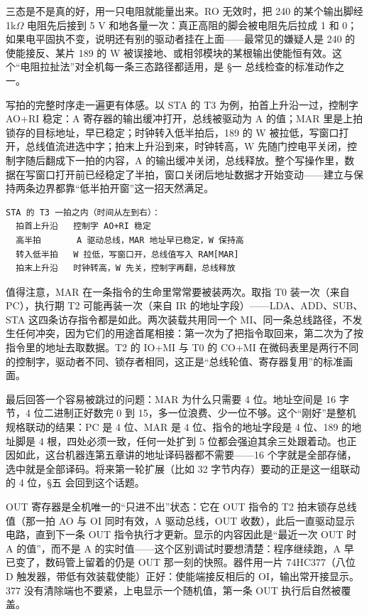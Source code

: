 三态是不是真的好，用一只电阻就能量出来。RO 无效时，把 240 的某个输出脚经 1k$\Omega$ 电阻先后接到 5 V 和地各量一次：真正高阻的脚会被电阻先后拉成 1 和 0；如果电平固执不变，说明还有别的驱动者挂在上面——最常见的嫌疑人是 240 的使能接反、某片 189 的 W 被误接地、或相邻模块的某根输出使能恒有效。这个“电阻拉扯法”对全机每一条三态路径都适用，是 §一 总线检查的标准动作之一。

写拍的完整时序走一遍更有体感。以 STA 的 T3 为例，拍首上升沿一过，控制字 AO+RI 稳定：A 寄存器的输出缓冲打开，总线被驱动为 A 的值；MAR 里是上拍锁存的目标地址，早已稳定；时钟转入低半拍后，189 的 W 被拉低，写窗口打开，总线值流进选中字；拍末上升沿到来，时钟转高，W 先随门控电平关闭，控制字随后翻成下一拍的内容，A 的输出缓冲关闭，总线释放。整个写操作里，数据在写窗口打开前已经稳定了半拍，窗口关闭后地址数据才开始变动——建立与保持两条边界都靠“低半拍开窗”这一招天然满足。

\begin{lstlisting}
STA 的 T3 一拍之内（时间从左到右）：
  拍首上升沿   控制字 AO+RI 稳定
  高半拍       A 驱动总线，MAR 地址早已稳定，W 保持高
  转入低半拍   W 拉低，写窗口开，总线值写入 RAM[MAR]
  拍末上升沿   时钟转高，W 先关，控制字再翻，总线释放
\end{lstlisting}

值得注意，MAR 在一条指令的生命里常常要被装两次。取指 T0 装一次（来自 PC），执行期 T2 可能再装一次（来自 IR 的地址字段）——LDA、ADD、SUB、STA 这四条访存指令都是如此。两次装载共用同一个 MI、同一条总线路径，不发生任何冲突，因为它们的用途首尾相接：第一次为了把指令取回来，第二次为了按指令里的地址去取数据。T2 的 IO+MI 与 T0 的 CO+MI 在微码表里是两行不同的控制字，驱动者不同、锁存者相同，这正是“总线轮值、寄存器复用”的标准画面。

最后回答一个容易被跳过的问题：MAR 为什么只需要 4 位。地址空间是 16 字节，4 位二进制正好数完 0 到 15，多一位浪费、少一位不够。这个“刚好”是整机规格联动的结果：PC 是 4 位、MAR 是 4 位、指令的地址字段是 4 位、189 的地址脚是 4 根，四处必须一致，任何一处扩到 5 位都会强迫其余三处跟着动。也正因如此，这台机器连第五章讲的地址译码器都不需要——16 个字就是全部存储，选中就是全部译码。将来第一轮扩展（比如 32 字节内存）要动的正是这一组联动的 4 位，§五 会回到这个话题。

OUT 寄存器是全机唯一的“只进不出”状态：它在 OUT 指令的 T2 拍末锁存总线值（那一拍 AO 与 OI 同时有效，A 驱动总线，OUT 收数），此后一直驱动显示电路，直到下一条 OUT 指令执行才更新。显示的内容因此是“最近一次 OUT 时 A 的值”，而不是 A 的实时值——这个区别调试时要想清楚：程序继续跑，A 早已变了，数码管上留着的仍是 OUT 那一刻的快照。器件用一片 74HC377（八位 D 触发器，带低有效装载使能）正好：使能端接反相后的 OI，输出常开接显示。377 没有清除端也不要紧，上电显示一个随机值，第一条 OUT 执行后自然被覆盖。


